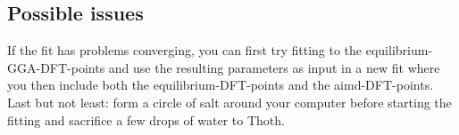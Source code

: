 \documentclass[11pt,oneside,a4paper, captions=nooneline, headsepline]{article}%
\begin{document}
\subsection{Possible issues}
If the fit has problems converging, you can first try fitting to the equilibrium-GGA-DFT-points and use the resulting parameters as input in a new fit where you then include both the equilibrium-DFT-points and the aimd-DFT-points.
Last but not least: form a circle of salt around your computer before starting the fitting and sacrifice a few drops of water to Thoth.\\


\end{document}
